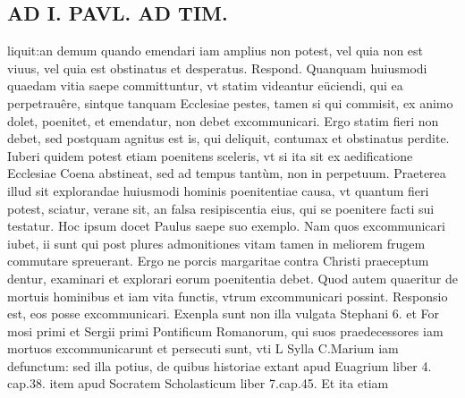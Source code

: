 \documentclass{article}
\begin{document}
\begin{pages}
\section*{AD I. PAVL. AD TIM. }
\marginpar{[ p.390 ]}\pstart liquit:an demum quando emendari iam amplius non potest, vel quia non est viuus, vel quia est obstinatus et desperatus. Respond. Quanquam huiusmodi quaedam vitia saepe committuntur, vt statim videantur eüciendi, qui ea perpetrauêre, sintque tanquam Ecclesiae pestes, tamen si qui commisit, ex animo dolet, poenitet, et emendatur, non debet excommunicari. Ergo statim fieri non debet, sed postquam agnitus est is, qui deliquit, contumax et obstinatus perdite. Iuberi quidem potest etiam poenitens sceleris, vt si ita sit ex aedificatione Ecclesiae Coena abstineat, sed ad tempus tantùm, non in perpetuum. Praeterea illud sit explorandae huiusmodi hominis poenitentiae causa, vt quantum fieri potest, sciatur, verane sit, an falsa resipiscentia eius, qui se poenitere facti sui testatur. Hoc ipsum docet Paulus saepe suo exemplo. Nam quos excommunicari iubet, ii sunt qui post plures admonitiones vitam tamen in meliorem frugem commutare spreuerant. Ergo ne porcis margaritae contra Christi praeceptum dentur, examinari et explorari eorum poenitentia debet.  \pend\pstart Quod autem quaeritur de mortuis hominibus et iam vita functis, vtrum excommunicari possint. Responsio est, eos posse excommunicari. Exenpla sunt non illa vulgata Stephani 6. et For mosi primi et Sergii primi Pontificum Romanorum, qui suos praedecessores iam mortuos excommunicarunt et persecuti sunt, vti L Sylla C.Marium iam defunctum: sed illa potius, de quibus historiae extant apud Euagrium liber  4. cap.38. item apud Socratem Scholasticum liber 7.cap.45. Et ita etiam  \pend

\end{pages}
\end{document}
